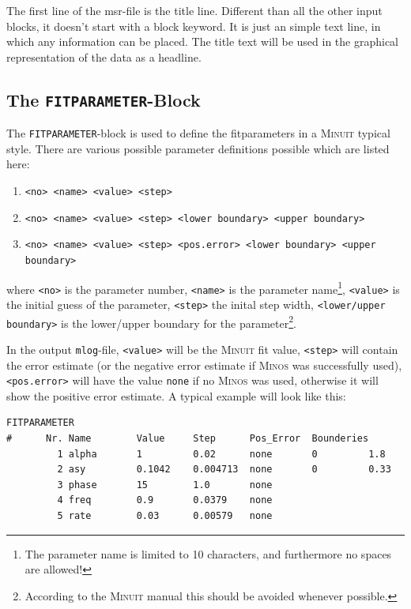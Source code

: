 \documentclass[twoside]{article}
\begin{document}
The first line of the msr-file is the title line. Different than all the other input blocks, it doesn't start with a block keyword. It is just an simple text line, in which any information can be placed. The title text will be used in the graphical representation of the data as a headline.

\subsection{The \texttt{FITPARAMETER}-Block}\label{subsec:msr-file-fitparameter-block}%

The \texttt{FITPARAMETER}-block is used to define the fitparameters in a \textsc{Minuit} typical style.
There are various possible parameter definitions possible which are listed here:

\begin{enumerate}
 \item \verb!<no> <name> <value> <step>!
 \item \verb!<no> <name> <value> <step> <lower boundary> <upper boundary>!
 \item \verb!<no> <name> <value> <step> <pos.error> <lower boundary> <upper boundary>!
\end{enumerate}

\noindent where \verb!<no>! is the parameter number, \verb!<name>! is the parameter name\footnote{The parameter name is limited to 10 characters, and furthermore no spaces are allowed!}, \verb!<value>! is the initial guess of the parameter, \verb!<step>! the inital step width, \verb!<lower/upper boundary>! is the lower/upper boundary for the parameter\footnote{According to the \textsc{Minuit} manual this should be avoided whenever possible.}.

In the output \texttt{mlog}-file, \verb!<value>! will be the \textsc{Minuit} fit value, \verb!<step>! will contain the error estimate (or the negative error estimate if \textsc{Minos} was successfully used), \verb!<pos.error>! will have the value \texttt{none} if no \textsc{Minos} was used, otherwise it will show the positive error estimate. A typical example will look like this:

\begin{verbatim}
FITPARAMETER
#      Nr. Name        Value     Step      Pos_Error  Bounderies
         1 alpha       1         0.02      none       0         1.8
         2 asy         0.1042    0.004713  none       0         0.33
         3 phase       15        1.0       none
         4 freq        0.9       0.0379    none
         5 rate        0.03      0.00579   none
\end{verbatim}
\end{document}
